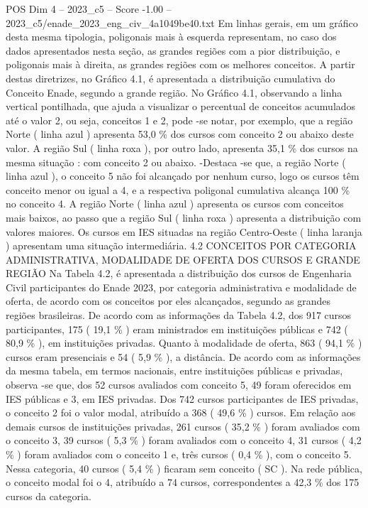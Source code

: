 \begin{textsample}{POS Dim 4 – 2023\_c5 – Score -1.00 – 2023\_c5/enade\_2023\_eng\_civ\_4a1049be40.txt}
Em linhas gerais, em um gráfico desta mesma tipologia, poligonais mais à esquerda representam, no caso dos dados apresentados nesta seção, as grandes regiões com a pior distribuição, e poligonais mais à direita, as grandes regiões com os melhores conceitos.
A partir destas diretrizes, no Gráfico 4.1, é apresentada a distribuição cumulativa do Conceito Enade, segundo a grande região.
No Gráfico 4.1, observando a linha vertical pontilhada, que ajuda a visualizar o percentual de conceitos acumulados até o valor 2, ou seja, conceitos 1 e 2, pode -se notar, por exemplo, que a região Norte ( linha azul ) apresenta 53,0 \% dos cursos com conceito 2 ou abaixo deste valor.
A região Sul ( linha roxa ), por outro lado, apresenta 35,1 \% dos cursos na mesma situação : com conceito 2 ou abaixo. -Destaca -se que, a região Norte ( linha azul ), o conceito 5 não foi alcançado por nenhum curso, logo os cursos têm conceito menor ou igual a 4, e a respectiva poligonal cumulativa alcança 100 \% no conceito 4.
A região Norte ( linha azul ) apresenta os cursos com conceitos mais baixos, ao passo que a região Sul ( linha roxa ) apresenta a distribuição com valores maiores.
Os cursos em IES situadas na região Centro-Oeste ( linha laranja ) apresentam uma situação intermediária. 4.2 CONCEITOS POR CATEGORIA ADMINISTRATIVA, MODALIDADE DE OFERTA DOS CURSOS E GRANDE REGIÃO Na Tabela 4.2, é apresentada a distribuição dos cursos de Engenharia Civil participantes do Enade 2023, por categoria administrativa e modalidade de oferta, de acordo com os conceitos por eles alcançados, segundo as grandes regiões brasileiras.
De acordo com as informações da Tabela 4.2, dos 917 cursos participantes, 175 ( 19,1 \% ) eram ministrados em instituições públicas e 742 ( 80,9 \% ), em instituições privadas.
Quanto à modalidade de oferta, 863 ( 94,1 \% ) cursos eram presenciais e 54 ( 5,9 \% ), a distância.
De acordo com as informações da mesma tabela, em termos nacionais, entre instituições públicas e privadas, observa -se que, dos 52 cursos avaliados com conceito 5, 49 foram oferecidos em IES públicas e 3, em IES privadas.
Dos 742 cursos participantes de IES privadas, o conceito 2 foi o valor modal, atribuído a 368 ( 49,6 \% ) cursos.
Em relação aos demais cursos de instituições privadas, 261 cursos ( 35,2 \% ) foram avaliados com o conceito 3, 39 cursos ( 5,3 \% ) foram avaliados com o conceito 4, 31 cursos ( 4,2 \% ) foram avaliados com o conceito 1 e, três cursos ( 0,4 \% ), com o conceito 5.
Nessa categoria, 40 cursos ( 5,4 \% ) ficaram sem conceito ( SC ).
Na rede pública, o conceito modal foi o 4, atribuído a 74 cursos, correspondentes a 42,3 \% dos 175 cursos da categoria.

\end{textsample}

